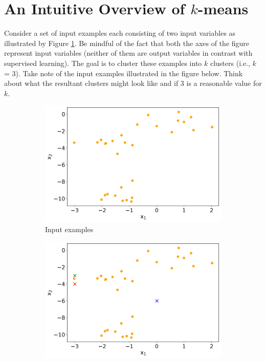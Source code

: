 \section{An Intuitive Overview of $k$-means}

Consider a set of input examples each consisting of two input variables as illustrated by Figure \ref{fig:input-data-a}. Be mindful of the fact that both the axes of the figure represent input variables (neither of them are output variables in contrast with supervised learning). The goal is to cluster these examples into $k$ clusters (i.e., $k$ = 3). Take note of the input examples illustrated in the figure below. Think about what the resultant clusters might look like and if 3 is a reasonable value for $k$. 
\begin{figure}
     \centering
     \begin{subfigure}[b]{0.48\textwidth}
         \centering
         \includegraphics[width=\textwidth]{"Part 3 - Learning Systems/Unsupervised Learning/k-Means/images/inputData.png"}
         \caption{Input examples}
         \label{fig:input-data-a}
     \end{subfigure}
     \hfill
     \begin{subfigure}[b]{0.48\textwidth}
         \centering
         \includegraphics[width=\textwidth]{"Part 3 - Learning Systems/Unsupervised Learning/k-Means/images/clusterInit.png"}

\end{subfigure}
\end{figure}
